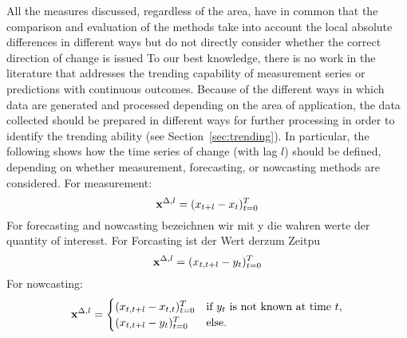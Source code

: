 All the measures discussed, regardless of the area, have in common that the comparison and evaluation of the methods take into account the local absolute differences in different ways but do not directly consider whether the correct direction of change is issued
To our best knowledge, there is no work in the literature that addresses the trending capability of measurement series or predictions with continuous outcomes.
Because of the different ways in which data are generated and processed depending on the area of application, the data collected should be prepared in different ways for further processing in order to identify the trending ability (see Section~\ref{sec:trending}). 
In particular, the following shows how the time series of change (with lag $l$) should be defined, depending on whether measurement, forecasting, or nowcasting methods are considered. For measurement:
\begin{equation}
    \mathbf{x}^{\Delta,l} = (x_{t+l} -x_{t})^T_{t=0} \label{eq:diffxl_measure}
\end{equation}
For forecasting and nowcasting bezeichnen wir mit y die wahren werte der quantity of interesst. For Forcasting ist der Wert derzum Zeitpu
\begin{equation}
    \mathbf{x}^{\Delta,l} = (x_{t,t+l} -y_{t})^T_{t=0} \label{eq:diffxl_forecasting}
\end{equation}
For nowcasting:
\begin{equation}
\mathbf{x}^{\Delta,l} = 
\begin{cases} 
(x_{t,t+l} -x_{t,t})^T_{t=0} & \text{if } y_{t} \text{ is not known at time } t, \\
(x_{t,t+l} -y_{t})^T_{t=0}  & \text{else}.
\end{cases} \label{eq:diffxl_nowcasting}
\end{equation}






